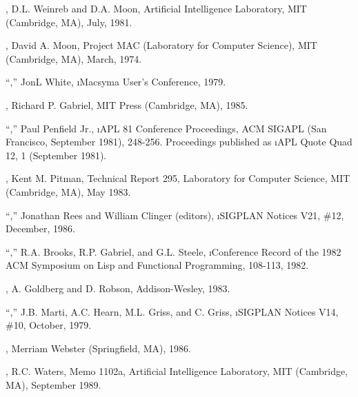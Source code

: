 \item{\bull} {\Chinual},
	D.L. Weinreb and D.A. Moon,
	Artificial Intelligence Laboratory, MIT (Cambridge, MA), July, 1981.

\item{\bull} {\Moonual},
	David A. Moon, Project MAC (Laboratory for Computer Science),
        MIT (Cambridge, MA), March, 1974.

\item{\bull} ``{\NILReport},'' 
        JonL White, \i{Macsyma User's Conference}, 1979.

\item{\bull} {\GabrielBenchmarks},
	Richard P. Gabriel, MIT Press (Cambridge, MA), 1985.

\item{\bull} ``{\PrincipalValues},'' 
        Paul Penfield Jr., \i{APL 81 Conference Proceedings},
        ACM SIGAPL (San Francisco, September 1981), 248-256.
        Proceedings published as \i{APL Quote Quad 12}, 1 (September 1981).

\item{\bull} {\Pitmanual},
	Kent M. Pitman, 
	Technical Report 295,
	Laboratory for Computer Science, MIT (Cambridge, MA), May 1983.

\item{\bull} ``{\RevisedCubedScheme},''
        Jonathan Rees and William Clinger (editors), 
        \i{SIGPLAN Notices} V21, \#12, December, 1986.

\item{\bull} ``\SOneCLPaper,''
	R.A. Brooks, R.P. Gabriel, and G.L. Steele,
	\i{Conference Record of the 1982 ACM Symposium on Lisp and Functional Programming},
	108-113, 1982.

\item{\bull} \SmalltalkBook,
        A. Goldberg and D. Robson, Addison-Wesley, 1983.

\item{\bull} ``{\StandardLispReport},''
        J.B. Marti, A.C. Hearn, M.L. Griss, and C. Griss,
        \i{SIGPLAN Notices} V14, \#10, October, 1979.

\item{\bull} {\WebstersDictionary},
	Merriam Webster (Springfield, MA), 1986.

\item{\bull} \XPPaper,
        R.C. Waters,
	Memo 1102a,
	Artificial Intelligence Laboratory, MIT (Cambridge, MA), September 1989.

\endlist
